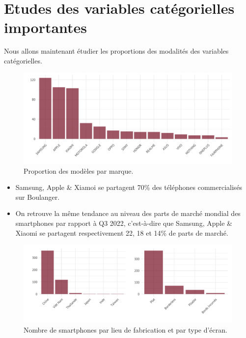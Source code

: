 \documentclass[
  12pt,
]{report}
\begin{document}
\newpage

\section{Etudes des variables catégorielles
importantes}\label{etudes-des-variables-catuxe9gorielles-importantes}

Nous allons maintenant étudier les proportions des modalités des
variables catégorielles.

\begin{figure}[H]

{\centering \includegraphics{report_files/figure-pdf/brand_prop-1.pdf}

}

\caption{Proportion des modèles par marque.}

\end{figure}%

\begin{itemize}
\item
  Samsung, Apple \& Xiamoi se partagent 70\% des téléphones
  commercialisés sur Boulanger.
\item
  On retrouve la même tendance au niveau des parts de marché mondial des
  smartphones par rapport à Q3 2022, c'est-à-dire que Samsung, Apple \&
  Xiaomi se partagent respectivement 22, 18 et 14\% de parts de marché.
\end{itemize}

\begin{figure}[H]

{\centering \includegraphics{report_files/figure-pdf/location_prop-1.pdf}

}

\caption{Nombre de smartphones par lieu de fabrication et par type
d'écran.}

\end{figure}%
\end{document}
